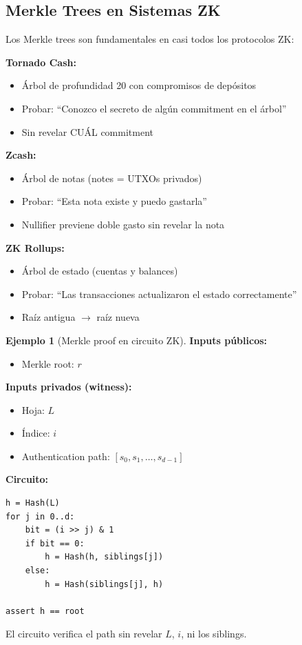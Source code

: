 \documentclass[11pt,a4paper,twoside,openright]{book}
\theoremstyle{definition}
\newtheorem{example}{Ejemplo}[chapter]
\theoremstyle{plain}
\theoremstyle{remark}
\begin{document}
\subsection{Merkle Trees en Sistemas ZK}

\begin{mathnote}
Los Merkle trees son fundamentales en casi todos los protocolos ZK:

\textbf{Tornado Cash:}
\begin{itemize}
    \item Árbol de profundidad 20 con compromisos de depósitos
    \item Probar: ``Conozco el secreto de algún commitment en el árbol''
    \item Sin revelar CUÁL commitment
\end{itemize}

\textbf{Zcash:}
\begin{itemize}
    \item Árbol de notas (notes = UTXOs privados)
    \item Probar: ``Esta nota existe y puedo gastarla''
    \item Nullifier previene doble gasto sin revelar la nota
\end{itemize}

\textbf{ZK Rollups:}
\begin{itemize}
    \item Árbol de estado (cuentas y balances)
    \item Probar: ``Las transacciones actualizaron el estado correctamente''
    \item Raíz antigua $\to$ raíz nueva
\end{itemize}
\end{mathnote}

\begin{example}[Merkle proof en circuito ZK]
\textbf{Inputs públicos:}
\begin{itemize}
    \item Merkle root: $r$
\end{itemize}

\textbf{Inputs privados (witness):}
\begin{itemize}
    \item Hoja: $L$
    \item Índice: $i$
    \item Authentication path: $[s_0, s_1, \ldots, s_{d-1}]$
\end{itemize}

\textbf{Circuito:}
\begin{verbatim}
h = Hash(L)
for j in 0..d:
    bit = (i >> j) & 1
    if bit == 0:
        h = Hash(h, siblings[j])
    else:
        h = Hash(siblings[j], h)

assert h == root
\end{verbatim}

El circuito verifica el path sin revelar $L$, $i$, ni los siblings.
\end{example}
\end{document}
